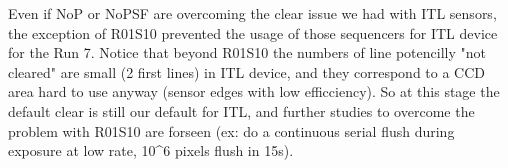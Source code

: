 %
%
%
%


Even if NoP or NoPSF are overcoming the clear issue we had with ITL
sensors, the exception of R01\label{s10}{S10} prevented
the usage of those sequencers for ITL device for the Run 7. Notice that
beyond R01\label{s10}{S10} the numbers of line potencilly
"not cleared" are small (2 first lines) in ITL device, and they
correspond to a CCD area hard to use anyway (sensor edges with low
efficciency). So at this stage the default clear is still our default
for ITL, and further studies to overcome the problem with
R01\label{s10}{S10} are forseen (ex: do a continuous
serial flush during exposure at low rate, 10\^{}6 pixels flush in 15s).

